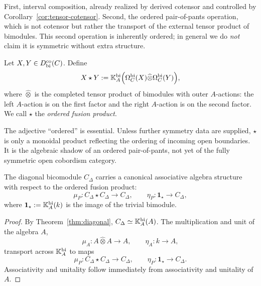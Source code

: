 First, interval composition, already realized by derived cotensor and controlled by
Corollary~\ref{cor:tensor-cotensor}. Second, the ordered pair-of-pants operation, which is not
cotensor but rather the transport of the external tensor product of bimodules. This second
operation is inherently ordered; in general we do \emph{not} claim it is symmetric without extra
structure.

\begin{definition}
Let $X,Y\in D^{\mathrm{co}}_{\mathrm{bi}}(C)$. Define
\[
X\star Y
:=
\mathbb{K}_A^{\mathrm{bi}}\Bigl(
\Omega_C^{\mathrm{bi}}(X)\widehat\otimes \Omega_C^{\mathrm{bi}}(Y)
\Bigr),
\]
where $\widehat\otimes$ is the completed tensor product of bimodules with outer $A$-actions:
the left $A$-action is on the first factor and the right $A$-action is on the second factor.
We call $\star$ the \emph{ordered fusion product}.
\end{definition}

\begin{remark}
The adjective ``ordered'' is essential. Unless further symmetry data are supplied, $\star$ is only
a monoidal product reflecting the ordering of incoming open boundaries. It is the algebraic shadow
of an ordered pair-of-pants, not yet of the fully symmetric open cobordism category.
\end{remark}

\begin{theorem}
The diagonal bicomodule $C_\Delta$ carries a canonical associative algebra structure with respect to
the ordered fusion product:
\[
\mu_P:C_\Delta\star C_\Delta\longrightarrow C_\Delta,
\qquad
\eta_P:\mathbf 1_\star\longrightarrow C_\Delta,
\]
where $\mathbf 1_\star:=\mathbb{K}_A^{\mathrm{bi}}(k)$ is the image of the trivial bimodule.
\end{theorem}

\begin{proof}
By Theorem~\ref{thm:diagonal}, $C_\Delta\simeq \mathbb{K}_A^{\mathrm{bi}}(A)$. The multiplication and unit
of the algebra $A$,
\[
\mu_A:A\widehat\otimes A\to A,\qquad \eta_A:k\to A,
\]
transport across $\mathbb{K}_A^{\mathrm{bi}}$ to maps
\[
\mu_P:C_\Delta\star C_\Delta\to C_\Delta,\qquad \eta_P:\mathbf 1_\star\to C_\Delta.
\]
Associativity and unitality follow immediately from associativity and unitality of $A$.
\end{proof}


